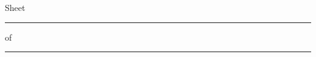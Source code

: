 \documentclass[10pt]{extarticle}
\begin{document}
\vfill

\begin{flushright}
  {\fontsize{6.8}{8.2}\selectfont\color{Stone}%
   Sheet \rule[-1pt]{22pt}{0.5pt} of \rule[-1pt]{22pt}{0.5pt}}
\end{flushright}
\end{document}
